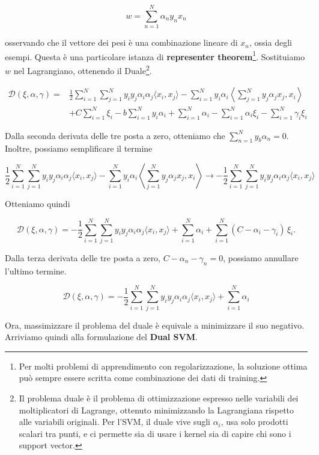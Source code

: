 $$
w = \sum_{n=1}^{N} \alpha_n y_n x_n
$$

osservando che il vettore dei pesi è una combinazione lineare di $x_n$, ossia degli esempi. Questa è una particolare istanza di \textbf{representer theorem}\footnote{Per molti problemi di apprendimento con regolarizzazione, la soluzione ottima può sempre essere scritta come combinazione dei dati di training.}. Sostituiamo $w$ nel Lagrangiano, ottenendo il Duale\footnote{Il problema duale è il problema di ottimizzazione espresso nelle variabili dei moltiplicatori di Lagrange, ottenuto minimizzando la Lagrangiana rispetto alle variabili originali. Per l’SVM, il duale vive sugli $\alpha_i$, usa solo prodotti scalari tra punti, e ci permette sia di usare i kernel sia di capire chi sono i support vector.}.

$$
\begin{aligned}
\mathcal{D}(\xi,\alpha,\gamma)
= &\frac{1}{2} \sum_{i=1}^{N} \sum_{j=1}^{N} 
y_i y_j \alpha_i \alpha_j \langle x_i, x_j \rangle
- \sum_{i=1}^{N} y_i \alpha_i 
\left\langle \sum_{j=1}^{N} y_j \alpha_j x_j, x_i \right\rangle
\\
&+ C \sum_{i=1}^{N} \xi_i
- b \sum_{i=1}^{N} y_i \alpha_i
+ \sum_{i=1}^{N} \alpha_i
- \sum_{i=1}^{N} \alpha_i \xi_i
- \sum_{i=1}^{N} \gamma_i \xi_i 
\end{aligned}
$$

Dalla seconda derivata delle tre posta a zero, otteniamo che $\sum_{n=1}^{N} y_b \alpha_n = 0$.  Inoltre, possiamo semplificare il termine

$$
 \frac{1}{2} \sum_{i=1}^{N} \sum_{j=1}^{N} 
y_i y_j \alpha_i \alpha_j \langle x_i, x_j \rangle
- \sum_{i=1}^{N} y_i \alpha_i 
\left\langle \sum_{j=1}^{N} y_j \alpha_j x_j, x_i \right\rangle
\to
-\frac{1}{2} \sum_{i=1}^{N} \sum_{j=1}^{N}
y_i y_j \alpha_i \alpha_j \langle x_i, x_j \rangle
$$

\noindent
Otteniamo quindi

$$
\mathcal{D}(\xi,\alpha,\gamma)
= -\frac{1}{2} \sum_{i=1}^{N} \sum_{j=1}^{N}
y_i y_j \alpha_i \alpha_j \langle x_i, x_j \rangle
+ \sum_{i=1}^{N} \alpha_i
+ \sum_{i=1}^{N} (C - \alpha_i - \gamma_i)\,\xi_i .
$$

Dalla terza derivata delle tre posta a zero, $C - \alpha_n - \gamma_n = 0$, possiamo annullare l'ultimo termine.

$$
\mathcal{D}(\xi,\alpha,\gamma)
= -\frac{1}{2} \sum_{i=1}^{N} \sum_{j=1}^{N}
y_i y_j \alpha_i \alpha_j \langle x_i, x_j \rangle
+ \sum_{i=1}^{N} \alpha_i
$$

Ora, massimizzare il problema del duale è equivale a minimizzare il suo negativo. Arriviamo quindi alla formulazione del \textbf{Dual SVM}.

